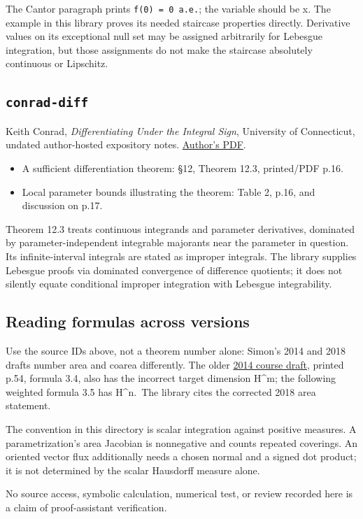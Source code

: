 \documentclass[
  11pt,
]{article}
\providecommand{\tightlist}{%
  \setlength{\itemsep}{0pt}\setlength{\parskip}{0pt}}
\begin{document}
The Cantor paragraph prints \texttt{f\textquotesingle{}(0)\ =\ 0\ a.e.};
the variable should be x. The example in this library proves its needed
staircase properties directly. Derivative values on its exceptional null
set may be assigned arbitrarily for Lebesgue integration, but those
assignments do not make the staircase absolutely continuous or
Lipschitz.

\subsection{\texorpdfstring{\texttt{conrad-\allowbreak{}diff}}{conrad-diff}}\label{conrad-diff}

Keith Conrad, \emph{Differentiating Under the Integral Sign}, University
of Connecticut, undated author-hosted expository notes.
\href{https://kconrad.math.uconn.edu/blurbs/analysis/diffunderint.pdf}{Author's
PDF}.

\begin{itemize}
\tightlist
\item
  A sufficient differentiation theorem: §12, Theorem 12.3, printed/PDF
  p.16.
\item
  Local parameter bounds illustrating the theorem: Table 2, p.16, and
  discussion on p.17.
\end{itemize}

Theorem 12.3 treats continuous integrands and parameter derivatives,
dominated by parameter-independent integrable majorants near the
parameter in question. Its infinite-interval integrals are stated as
improper integrals. The library supplies Lebesgue proofs via dominated
convergence of difference quotients; it does not silently equate
conditional improper integration with Lebesgue integrability.

\subsection{Reading formulas across
versions}\label{reading-formulas-across-versions}

Use the source IDs above, not a theorem number alone: Simon's 2014 and
2018 drafts number area and coarea differently. The older
\href{https://web.stanford.edu/class/math285/ts-gmt.pdf}{2014 course
draft}, printed p.54, formula 3.4, also has the incorrect target
dimension H\^{}m; the following weighted formula 3.5 has H\^{}n.~The
library cites the corrected 2018 area statement.

The convention in this directory is scalar integration against positive
measures. A parametrization's area Jacobian is nonnegative and counts
repeated coverings. An oriented vector flux additionally needs a chosen
normal and a signed dot product; it is not determined by the scalar
Hausdorff measure alone.

No source access, symbolic calculation, numerical test, or review
recorded here is a claim of proof-assistant verification.
\end{document}
